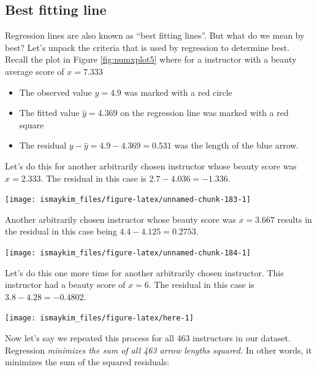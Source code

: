 \documentclass[12pt, krantz2,]{krantz}
\providecommand{\tightlist}{%
  \setlength{\itemsep}{0pt}\setlength{\parskip}{0pt}}
\begin{document}
\hypertarget{leastsquares}{%
\subsection{Best fitting line}\label{leastsquares}}

Regression lines are also known as ``best fitting lines''. But what do we mean by best? Let's unpack the criteria
that is used by regression to determine best. Recall the plot in Figure \ref{fig:numxplot5} where for a instructor
with a beauty average score of \(x=7.333\)

\begin{itemize}
\tightlist
\item
  The observed value \(y=4.9\) was marked with a red circle
\item
  The fitted value \(\widehat{y} = 4.369\) on the regression line was marked with a red square
\item
  The residual \(y-\widehat{y} = 4.9-4.369 = 0.531\) was the length of the blue arrow.
\end{itemize}

Let's do this for another arbitrarily chosen instructor whose beauty score was
\(x=2.333\). The residual in this case is \(2.7 - 4.036 = -1.336\).

\begin{center}\texttt{[image: ismaykim\_files/figure-latex/unnamed-chunk-183-1]} \end{center}

Another arbitrarily chosen instructor whose beauty score was
\(x=3.667\) results in the residual in this case being \(4.4 - 4.125 = 0.2753\).

\begin{center}\texttt{[image: ismaykim\_files/figure-latex/unnamed-chunk-184-1]} \end{center}

Let's do this one more time for another arbitrarily chosen instructor. This instructor had a beauty score of
\(x = 6\). The residual in this case is \(3.8 - 4.28 = -0.4802\).

\begin{center}\texttt{[image: ismaykim\_files/figure-latex/here-1]} \end{center}

Now let's say we repeated this process for all 463 instructors in our
dataset. Regression \emph{minimizes the sum of all 463 arrow lengths
squared.} In other words, it minimizes the sum of the squared residuals:
\end{document}
